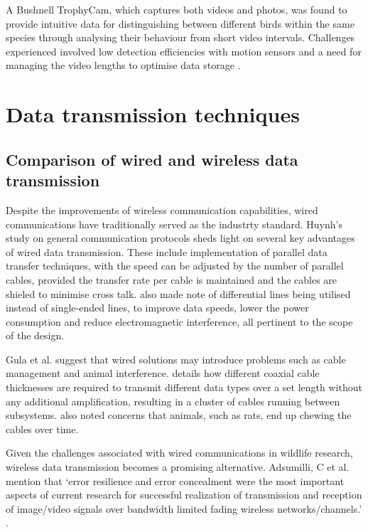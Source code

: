 \documentclass[class=report,11pt,crop=false]{standalone}
\begin{document}
A Bushnell TrophyCam, which captures both videos and photos, was found to provide intuitive data for distinguishing between different birds within the same species through analysing their behaviour from short video intervals. Challenges experienced involved low detection efficiencies with motion sensors and a need for managing the video lengths to optimise data storage \cite{ribeiro-silva2018testing}. 


\section{Data transmission techniques}

\subsection{Comparison of wired and wireless data transmission}

Despite the improvements of wireless communication capabilities, wired communications have traditionally served as the industrty standard. Huynh’s study on general communication protocols \cite{huynh2010study} sheds light on several key advantages of wired data transmission. These include implementation of parallel data transfer techniques, with the speed can be adjusted by the number of parallel cables, provided the transfer rate per cable is maintained and the cables are shieled to minimise cross talk. \cite{huynh2010study} also made note of differential lines being utilised instead of single-ended lines, to improve data speeds, lower the power consumption and reduce electromagnetic interference, all pertinent to the scope of the design.

Gula et al. suggest that wired solutions may introduce problems such as cable management and animal interference. \cite{gula2010audio} details how different coaxial cable thicknesses are required to transmit different data types over a set length without any additional amplification, resulting in a cluster of cables running between subsystems. \cite{gula2010audio} also noted concerns that animals, such as rats, end up chewing the cables over time. 

Given the challenges associated with wired communications in wildlife research, wireless data transmission becomes a promising alternative. Adsumilli, C et al.  mention that ‘error resilience and error concealment were the most important aspects of current research for successful realization of transmission and reception of image/video signals over bandwidth limited fading wireless networks/channels.’ \cite{adsumilli2002adaptive}. %
\end{document}
